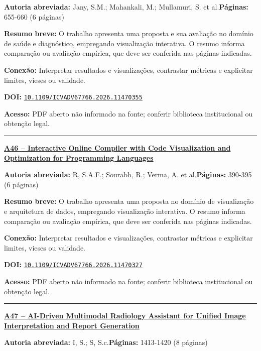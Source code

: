 \documentclass[10pt,a4paper]{article}
\begin{document}
\textbf{Autoria abreviada:} Jany, S.M.; Mahankali, M.; Mullamuri, S. et al.\quad \textbf{Páginas:} 655-660 (6 páginas)\par
\textbf{Resumo breve:} O trabalho apresenta uma proposta e sua avaliação no domínio de saúde e diagnóstico, empregando visualização interativa. O resumo informa comparação ou avaliação empírica, que deve ser conferida nas páginas indicadas.\par
\textbf{Conexão:} Interpretar resultados e visualizações, contrastar métricas e explicitar limites, vieses ou validade.\par
\textbf{DOI:} \href{https://doi.org/10.1109/ICVADV67766.2026.11470355}{\nolinkurl{10.1109/ICVADV67766.2026.11470355}}\par
\textbf{Acesso:} PDF aberto não informado na fonte; conferir biblioteca institucional ou obtenção legal.\par
\noindent\rule{\textwidth}{0.35pt}
\par\medskip\noindent
{\large\bfseries\href{https://doi.org/10.1109/ICVADV67766.2026.11470327}{A46 -- Interactive Online Compiler with Code Visualization and Optimization for Programming Languages}}\par\smallskip
\textbf{Autoria abreviada:} R, S.A.F.; Sourabh, R.; Verma, A. et al.\quad \textbf{Páginas:} 390-395 (6 páginas)\par
\textbf{Resumo breve:} O trabalho apresenta uma proposta no domínio de visualização e arquitetura de dados, empregando visualização interativa. O resumo informa comparação ou avaliação empírica, que deve ser conferida nas páginas indicadas.\par
\textbf{Conexão:} Interpretar resultados e visualizações, contrastar métricas e explicitar limites, vieses ou validade.\par
\textbf{DOI:} \href{https://doi.org/10.1109/ICVADV67766.2026.11470327}{\nolinkurl{10.1109/ICVADV67766.2026.11470327}}\par
\textbf{Acesso:} PDF aberto não informado na fonte; conferir biblioteca institucional ou obtenção legal.\par
\noindent\rule{\textwidth}{0.35pt}
\par\medskip\noindent
{\large\bfseries\href{https://doi.org/10.1109/ICVADV67766.2026.11470428}{A47 -- AI-Driven Multimodal Radiology Assistant for Unified Image Interpretation and Report Generation}}\par\smallskip
\textbf{Autoria abreviada:} I, S.; S, S.c.\quad \textbf{Páginas:} 1413-1420 (8 páginas)\par
\end{document}
